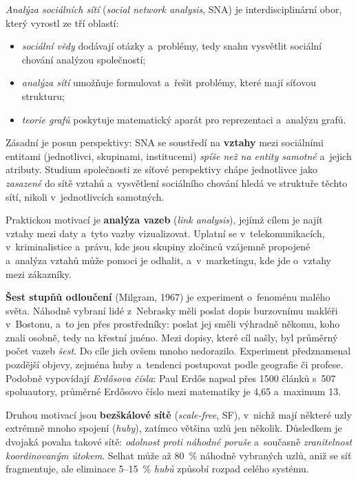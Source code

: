\documentclass[11pt,a4paper]{article}
\theoremstyle{definition}
\begin{document}
\begin{defbox}
\emph{Analýza sociálních sítí} (\emph{social network analysis}, SNA) je interdisciplinární
obor, který vyrostl ze tří oblastí:
\begin{itemize}
\item \emph{sociální vědy} dodávají otázky a~problémy, tedy snahu vysvětlit sociální chování
      analýzou společností;
\item \emph{analýza sítí} umožňuje formulovat a~řešit problémy, které mají síťovou strukturu;
\item \emph{teorie grafů} poskytuje matematický aparát pro reprezentaci a~analýzu grafů.
\end{itemize}
Zásadní je posun perspektivy: SNA se soustředí na \textbf{vztahy} mezi sociálními entitami
(jednotlivci, skupinami, institucemi) \emph{spíše než na entity samotné} a~jejich atributy.
Studium společnosti ze síťové perspektivy chápe jednotlivce jako \emph{zasazené} do sítě
vztahů a~vysvětlení sociálního chování hledá ve struktuře těchto sítí, nikoli
v~jednotlivcích samotných.
\end{defbox}

Praktickou motivací je \textbf{analýza vazeb} (\emph{link analysis}), jejímž cílem je najít
vztahy mezi daty a~tyto vazby vizualizovat. Uplatní se v~telekomunikacích,
v~kriminalistice a~právu, kde jsou skupiny zločinců vzájemně propojené a~analýza vztahů může
pomoci je odhalit, a~v~marketingu, kde jde o~vztahy mezi zákazníky.

\textbf{Šest stupňů odloučení} (Milgram, 1967) je experiment o~fenoménu malého světa.
Náhodně vybraní lidé z~Nebrasky měli poslat dopis burzovnímu makléři v~Bostonu, a~to jen
přes prostředníky: poslat jej směli výhradně někomu, koho znali osobně, tedy na křestní
jméno. Mezi dopisy, které cíl našly, byl průměrný počet vazeb \emph{šest}. Do cíle jich
ovšem mnoho nedorazilo. Experiment předznamenal pozdější objevy, zejména huby a~tendenci
postupovat podle geografie či profese. Podobně vypovídají \emph{Erdősova čísla}: Paul Erdős
napsal přes 1500 článků s~507 spoluautory, průměrné Erdősovo číslo mezi matematiky je 4,65
a~maximum 13.

Druhou motivací jsou \textbf{bezškálové sítě} (\emph{scale-free}, SF), v~nichž mají některé
uzly extrémně mnoho spojení (\emph{huby}), zatímco většina uzlů jen několik. Důsledkem je
dvojaká povaha takové sítě: \emph{odolnost proti náhodné poruše} a~současně
\emph{zranitelnost koordinovaným útokem}. Selhat může až 80~\% náhodně vybraných uzlů, aniž
se síť fragmentuje, ale eliminace 5--15~\% \emph{hubů} způsobí rozpad celého systému.
\end{document}
